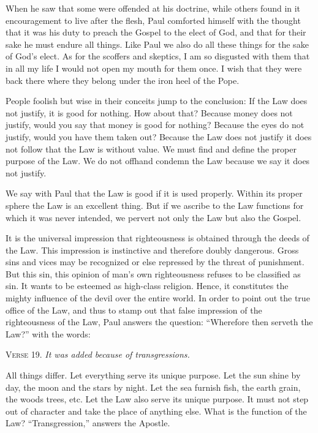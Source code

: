 When he saw that some were offended at his doctrine, while others found in it encouragement to live after the flesh, Paul comforted himself with the thought that it was his duty to preach the Gospel to the elect of God, and that for their sake he must endure all things. Like Paul we also do all these things for the sake of God’s elect. As for the scoffers and skeptics, I am so disgusted with them that in all my life I would not open my mouth for them once. I wish that they were back there where they belong under the iron heel of the Pope.

People foolish but wise in their conceits jump to the conclusion: If the Law does not justify, it is good for nothing. How about that? Because money does not justify, would you say that money is good for nothing? Because the eyes do not justify, would you have them taken out? Because the Law does not justify it does not follow that the Law is without value. We must find and define the proper purpose of the Law. We do not offhand condemn the Law because we say it does not justify.

We say with Paul that the Law is good if it is used properly. Within its proper sphere the Law is an excellent thing. But if we ascribe to the Law functions for which it was never intended, we pervert not only the Law but also the Gospel.

It is the universal impression that righteousness is obtained through the deeds of the Law. This impression is instinctive and therefore doubly dangerous. Gross sins and vices may be recognized or else repressed by the threat of punishment. But this sin, this opinion of man’s own righteousness refuses to be classified as sin. It wants to be esteemed as high-class religion. Hence, it constitutes the mighty influence of the devil over the entire world. In order to point out the true office of the Law, and thus to stamp out that false impression of the righteousness of the Law, Paul answers the question: “Wherefore then serveth the Law?” with the words:

\textsc{Verse} 19. \emph{It was added because of transgressions.}

All things differ. Let everything serve its unique purpose. Let the sun shine by day, the moon and the stars by night. Let the sea furnish fish, the earth grain, the woods trees, etc. Let the Law also serve its unique purpose. It must not step out of character and take the place of anything else. What is the function of the Law? “Transgression,” answers the Apostle.

